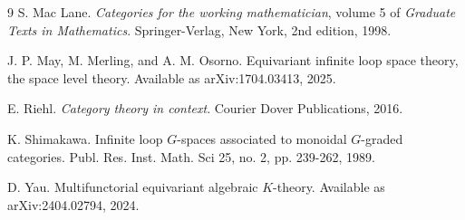 \documentclass{article}
\begin{document}
\begin{thebibliography}{9}
S. Mac Lane.
\emph{Categories for the working mathematician}, volume 5 of \emph{Graduate Texts in Mathematics}. Springer-Verlag, New York, 2nd edition, 1998.

J. P. May, M. Merling, and A. M. Osorno.
Equivariant infinite loop space theory, the space level theory.
Available as arXiv:1704.03413, 2025.

E. Riehl.
\emph{Category theory in context}. Courier Dover Publications, 2016.

K. Shimakawa. 
Infinite loop $G$-spaces associated to monoidal $G$-graded categories.
Publ. Res. Inst. Math. Sci 25, no. 2, pp. 239-262, 1989.

D. Yau. Multifunctorial equivariant algebraic $K$-theory. Available as arXiv:2404.02794, 2024.

\end{thebibliography}
\end{document}
